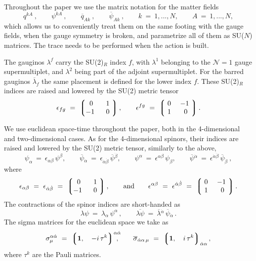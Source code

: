 \documentclass[12pt]{article}
\newcommand{\none}{${\mathcal N}=1$ }
\newcommand{\ov}{\overline}
\newcommand{\lgr}{\left\lgroup}
\newcommand{\rgr}{\right\rgroup}
\begin{document}
\setcounter{equation}{0}

Throughout the paper we use the matrix notation for the matter fields
\[
	q^{kA}~, \qquad \psi^{kA}~,\qquad \ov{q}_{Ak}~, \qquad \ov{\psi}_{Ak}~,
	\qquad k~=~1,...,N, \qquad A~=~1,...,N,
\]
which allows us to conveniently treat them on the same footing with the gauge fields, when the gauge
symmetry is broken, and parametrize all of them as SU($N$) matrices. 
The trace needs to be performed when the action is built.

The gauginos $ \lambda^f $ carry the SU(2)$_R$ index $ f $, with $ \lambda^1 $ belonging
to the \none gauge supermultiplet, and $ \lambda^2 $ being part of the adjoint supermultiplet. 
For the barred gauginos $ \ov{\lambda}_f $ the same placement is defined for the lower
index $ f $.
These SU(2)$_R$ indices are raised and lowered by the SU(2) metric tensor
\[
	\epsilon_{fg} ~=~ 
			\lgr \begin{matrix}
			     	\ 0\  &  \ 1\   \\
				 -1\  &  \ 0\  
			     \end{matrix} \rgr,
	\qquad 
	\epsilon^{fg} ~=~ 
			\lgr \begin{matrix}
				\ 0\ &   -1\   \\
				\ 1\ &  \ 0\ 
			     \end{matrix} \rgr.
\]

We use euclidean space-time throughout the paper, both in the 4-dimensional and two-dimensional
cases.
As for the 4-dimensional spinors, their indices are raised and lowered by the SU(2) metric tensor,
similarly to the above,
\[
	\psi_\alpha ~=~ \epsilon_{\alpha\beta}\, \psi^\beta, \qquad
	\ov{\psi}{}_{\dot{\alpha}} ~=~ \epsilon_{\dot{\alpha}\dot{\beta}}\, \ov{\psi}{}^{\dot\beta}, \qquad 
	\psi^\alpha ~=~ \epsilon^{\alpha\beta}\, \psi_\beta, \qquad
	\ov{\psi}{}^{\dot{\alpha}} ~=~ \epsilon^{\dot\alpha\dot\beta}\, \ov{\psi}{}_{\dot\beta}~,
\]
	where
\[
	\epsilon_{\alpha\beta} ~=~ \epsilon_{\dot\alpha\dot\beta} ~=~
			\lgr \begin{matrix}
			     	\ 0\  &  \ 1\   \\
				 -1\  &  \ 0\  
			     \end{matrix} \rgr,
	\qquad \text{and} \qquad
	\epsilon^{\alpha\beta} ~=~ \epsilon^{\dot\alpha\dot\beta} ~=~
			\lgr \begin{matrix}
				\ 0\ &   -1\   \\
				\ 1\ &  \ 0\ 
			     \end{matrix} \rgr.
\]
The contractions of the spinor indices are short-handed as
\[
	\lambda\psi ~=~ \lambda_\alpha\, \psi^\alpha\,, \qquad
	\ov{\lambda\psi} ~=~  \ov{\lambda}{}^{\dot\alpha}\, \ov{\psi}{}_{\dot\alpha}\,.
\]
The sigma matrices for the euclidean space we take as
\[
	\sigma^{\alpha\dot\alpha}_\mu ~=~  \lgr {\bf 1},\quad -i\,\tau^k \rgr^{\alpha\dot{\alpha}}
	\hspace{-2.0ex},
	\qquad
	\ov{\sigma}{}_{\dot\alpha\alpha\, \mu} ~=~ 
			\lgr {\bf 1},\quad i\, \tau^k \rgr_{\dot\alpha\alpha},
\]
where $ \tau^k $ are the Pauli matrices.
\end{document}
